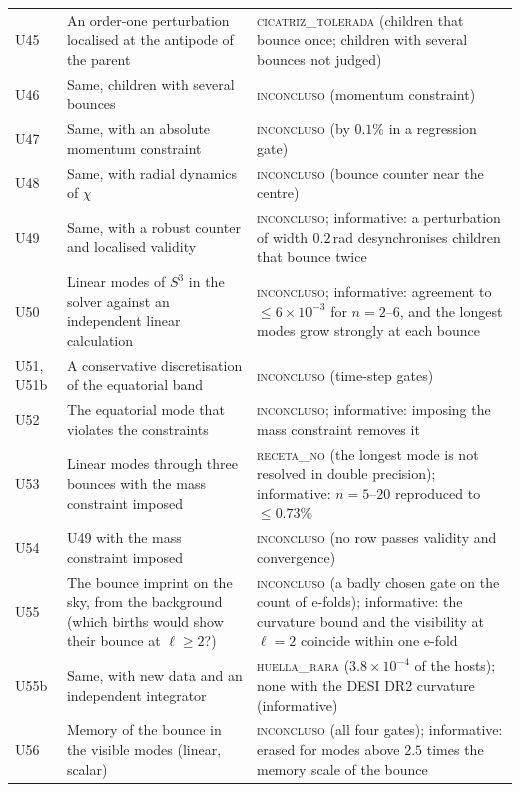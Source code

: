 \documentclass[11pt,a4paper]{article}
\begin{document}
\begin{small}
\begin{longtable}{L{1.3cm}L{6.0cm}L{7.0cm}}
U45 & An order-one perturbation localised at the antipode of the parent & \textsc{cicatriz\_tolerada} (children that bounce once; children with several bounces not judged) \\
U46 & Same, children with several bounces & \textsc{inconcluso} (momentum constraint) \\
U47 & Same, with an absolute momentum constraint & \textsc{inconcluso} (by $0.1\%$ in a regression gate) \\
U48 & Same, with radial dynamics of $\chi$ & \textsc{inconcluso} (bounce counter near the centre) \\
U49 & Same, with a robust counter and localised validity & \textsc{inconcluso}; informative: a perturbation of width $0.2$\,rad desynchronises children that bounce twice \\
U50 & Linear modes of $S^3$ in the solver against an independent linear calculation & \textsc{inconcluso}; informative: agreement to $\le6\times10^{-3}$ for $n=2$--$6$, and the longest modes grow strongly at each bounce \\
U51, U51b & A conservative discretisation of the equatorial band & \textsc{inconcluso} (time-step gates) \\
U52 & The equatorial mode that violates the constraints & \textsc{inconcluso}; informative: imposing the mass constraint removes it \\
U53 & Linear modes through three bounces with the mass constraint imposed & \textsc{receta\_no} (the longest mode is not resolved in double precision); informative: $n=5$--$20$ reproduced to $\le0.73\%$ \\
U54 & U49 with the mass constraint imposed & \textsc{inconcluso} (no row passes validity and convergence) \\
U55 & The bounce imprint on the sky, from the background (which births would show their bounce at $\ell\ge2$?) & \textsc{inconcluso} (a badly chosen gate on the count of e-folds); informative: the curvature bound and the visibility at $\ell=2$ coincide within one e-fold \\
U55b & Same, with new data and an independent integrator & \textsc{huella\_rara} ($3.8\times10^{-4}$ of the hosts); none with the DESI DR2 curvature (informative) \\
U56 & Memory of the bounce in the visible modes (linear, scalar) & \textsc{inconcluso} (all four gates); informative: erased for modes above $2.5$ times the memory scale of the bounce \\
\end{longtable}
\end{small}



\end{document}
